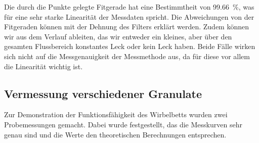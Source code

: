 \begin{figure}[H]
\end{figure}




Die durch die Punkte gelegte Fitgerade hat eine Bestimmtheit von \SI{99,66}{\%}, was für eine sehr starke Linearität der Messdaten spricht. Die Abweichungen von der Fitgeraden können mit der Dehnung des Filters erklärt werden. Zudem können wir aus dem Verlauf ableiten, das wir entweder ein kleines, aber über den gesamten Flussbereich konstantes Leck oder kein Leck haben. Beide Fälle wirken sich nicht auf die Messgenauigkeit der Messmethode aus, da für diese vor allem die Linearität wichtig ist. 

\newpage

\subsection{Vermessung verschiedener Granulate}

Zur Demonstration der Funktionsfähigkeit des Wirbelbetts wurden zwei Probemessungen gemacht. Dabei wurde festgestellt, das die Messkurven sehr genau sind und die Werte den theoretischen Berechnungen entsprechen.

